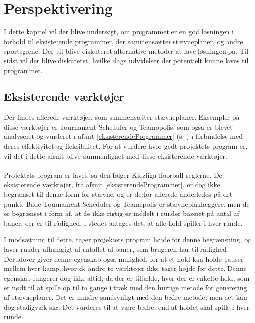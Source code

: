\chapter{Perspektivering}\label{ch:perspektivering}
I dette kapitel vil der blive undersøgt, om programmet er en god løsningen i forhold til eksisterende programmer, der sammensætter stævneplaner, og andre sportsgrene. Der vil blive diskuteret alternative metoder at lave løsningen på. Til sidst vil der blive diskuteret, hvilke slags udvidelser der potentielt kunne laves til programmet.

\section{Eksisterende værktøjer}
Der findes allerede værktøjer, som sammensætter stævneplaner. Eksempler på disse værktøjer er Tournament Scheduler og Teamopolis, som også er blevet analyseret og vurderet i afsnit \ref{eksisterendeProgrammer} (s. \pageref{eksisterendeProgrammer}) i forbindelse med deres effektivitet og fleksibilitet. For at vurdere hvor godt projektets program er, vil det i dette afsnit blive sammenlignet med disse eksisterende værktøjer.
\\\\
Projektets program er lavet, så den følger Kidzliga floorball reglerne. De eksisterende værktøjer, fra afsnit \ref{eksisterendeProgrammer}, er dog ikke begrænset til denne form for stævne, og er derfor allerede anderledes på det punkt. Både Tournament Scheduler og Teamopolis er stævneplanlæggere, men de er begrænset i form af, at de ikke rigtig er inddelt i runder baseret på antal af baner, der er til rådighed. I stedet antages det, at alle hold spiller i hver runde. 
\par
I modsætning til dette, tager projektets program højde for denne begrænsning, og laver runder afhængigt af antallet af baner, som brugeren har til rådighed. Derudover giver denne egenskab også mulighed, for at et hold kan holde pauser mellem hver kamp, hvor de andre to værktøjer ikke tager højde for dette. Denne egenskab fungerer dog ikke altid, da der er tilfælde, hvor der er enkelte hold, som er nødt til at spille op til to gange i træk med den hurtige metode for generering af stævneplaner. Det er mindre sandsynligt med den bedre metode, men det kan dog stadigvæk ske. Det vurderes til at være bedre, end at holdet skal spille i hver runde. 
\\\\
